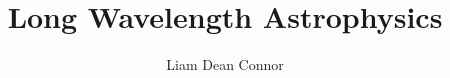 \documentclass[12pt]{ut-thesis}
\author{Liam Dean Connor}
\title{Long Wavelength Astrophysics}
\begin{document}
\begin{preliminary}

\maketitle




\end{preliminary}
\end{document}
